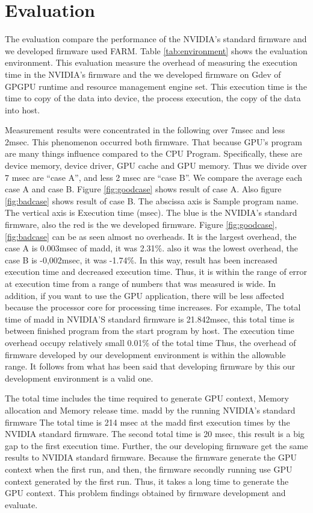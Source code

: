 \section{Evaluation}\label{sec:evaluation}
The evaluation compare the performance of the NVIDIA's standard firmware and we developed firmware used FARM.
Table \ref{tab:environment} shows the evaluation environment.
This evaluation measure the overhead of measuring the execution time in the NVIDIA's firmware and the we developed firmware on Gdev\cite{kato:gdev}\cite{kato:gdev2} of GPGPU runtime and resource management engine set.
This execution time is the time to copy of the data into device, the process execution, 
the copy of the data into host.
\par
Measurement results were concentrated in the following over 7msec and less 2msec.
This phenomenon occurred both firmware.
That because GPU's program are many things influence compared to the CPU Program.
Specifically, these are device memory, device driver, GPU cache and GPU memory.
Thus we divide over 7 msec are ``case A'', and less 2 msec are ``case B''.
We compare the average each case A and case B.
Figure \ref{fig:goodcase} shows result of case A.
Also figure \ref{fig:badcase} shows result of case B.
The abscissa axis is Sample program name.
The vertical axis is Execution time (msec).
The blue is the NVIDIA's standard firmware, also the red is the we developed firmware.
Figure \ref{fig:goodcase}, \ref{fig:badcase} can be as seen almost no overheads. 
It is the largest overhead, the case A is 0.003msec of madd, it was 2.31\%.
also it was the lowest overhead, the case B is -0,002msec, it was -1.74\%.
In this way, result has been increased execution time and decreased execution time.
Thus, it is within the range of error at execution time from a range of numbers that was measured is wide.
In addition, if you want to use the GPU application, there will be less affected because the processor core for processing time increases.
For example, The total time of madd in NVIDIA'S standard firmware is 21.842msec, this total time is between finished program from the start program by host.
The execution time overhead occupy relatively small 0.01\% of the total time
Thus, the overhead of firmware developed by our development environment is within the allowable range.
It follows from what has been said that developing firmware by this our development environment is a valid one.
\par
The total time includes the time required to generate GPU context, Memory allocation and Memory release time. 
madd by the running NVIDIA's standard firmware
The total time is 214 msec at the madd first execution times by the NVIDIA standard firmware.
The second total time is 20 msec, this result is a big gap to the first execution time.
Further, the our developing firmware get the same results to NVIDIA standard firmware.
Because the firmware generate the GPU context when the first run, and then, the firmware secondly running use GPU context generated by the first run.
Thus, it takes a long time to generate the GPU context.
This problem findings obtained by firmware development and evaluate.

